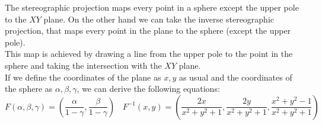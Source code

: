 \documentclass[12pt]{article}
\begin{document}
    The stereographic projection maps every point in a sphere except the upper pole to the $XY$ plane. On the other hand we can take the inverse stereographic projection, that maps every point in the plane to the sphere (except the upper pole). \\
    
    This map is achieved by drawing a line from the upper pole to the point in the sphere and taking the intersection with the $XY$ plane. \\
    
    If we define the coordinates of the plane as $x, y$ as usual and the coordinates of the sphere as $\alpha, \beta, \gamma$, we can derive the following equations:
    \[F(\alpha, \beta, \gamma)=\left(\frac{\alpha}{1-\gamma}, \frac{\beta}{1-\gamma}\right) \ \ \ \
    F^{-1}(x, y)=\left(\frac{2x}{x^2+y^2+1}, \frac{2y}{x^2+y^2+1}, \frac{x^2+y^2-1}{x^2+y^2+1}\right)\]
\end{document}
